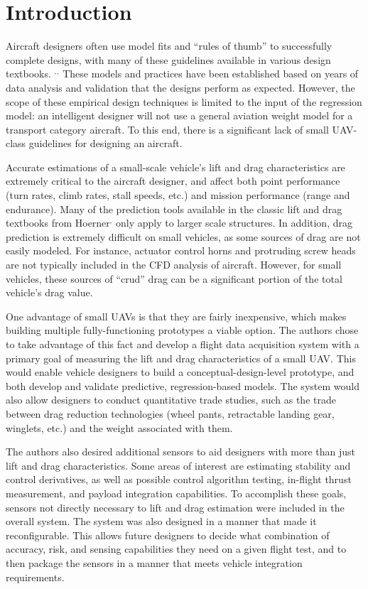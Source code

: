 \chapter{Introduction}
\label{intro}
Aircraft designers often use model fits and ``rules of thumb'' to successfully complete designs, with many of these guidelines available in various design textbooks. \cite{raymer}$^,$\cite{nicolai2010fundamentals}$^,$\cite{roskam1985airplane} These models and practices have been established based on years of data analysis and validation that the designs perform as expected. However, the scope of these empirical design techniques is limited to the input of the regression model: an intelligent designer will not use a general aviation weight model for a transport category aircraft. To this end, there is a significant lack of small UAV-class guidelines for designing an aircraft.

 Accurate estimations of a small-scale vehicle's lift and drag characteristics are extremely critical to the aircraft designer, and affect both point performance (turn rates, climb rates, stall speeds, etc.) and mission performance (range and endurance). Many of the prediction tools available in the classic lift and drag textbooks from Hoerner\cite{hoernerDrag}$^,$\cite{hoernerLift} only apply to larger scale structures. In addition, drag prediction is extremely difficult on small vehicles, as some sources of drag are not easily modeled. For instance, actuator control horns and protruding screw heads are not typically included in the CFD  analysis of aircraft. However, for small vehicles, these sources of ``crud'' drag can be a significant portion of the total vehicle's drag value. 
 
 One advantage of small UAVs is that they are fairly inexpensive, which makes building multiple fully-functioning prototypes a viable option. The authors chose to take advantage of this fact and develop a flight data acquisition system with a primary goal of measuring the lift and drag characteristics of a small UAV. This would enable vehicle designers to build a conceptual-design-level prototype, and both develop and validate predictive, regression-based models. The system would also allow designers to conduct quantitative trade studies, such as the trade between drag reduction technologies (wheel pants, retractable landing gear, winglets, etc.) and the weight associated with them.

The authors also desired additional sensors to aid designers with more than just lift and drag characteristics. Some areas of interest are estimating stability and control derivatives, as well as possible control algorithm testing, in-flight thrust measurement, and payload integration capabilities. To accomplish these goals, sensors not directly necessary to lift and drag estimation were included in the overall system. The system was also designed in a manner that made it reconfigurable. This allows future designers to decide what combination of accuracy, risk, and sensing capabilities they need on a given flight test, and to then package the sensors in a manner that meets vehicle integration requirements.


